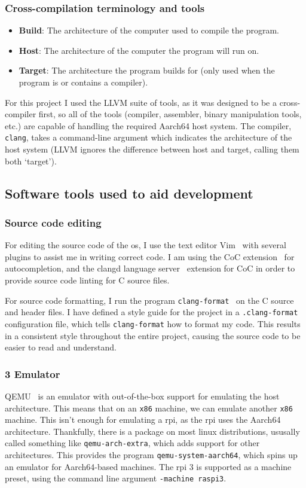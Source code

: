 \documentclass{article}
\begin{document}
\subsubsection{Cross-compilation terminology and tools}
\begin{itemize}
    \item \textbf{Build}: The architecture of the computer used to compile the
        program.
    \item \textbf{Host}: The architecture of the computer the program will run
        on.
    \item \textbf{Target}: The architecture the program builds for (only used
        when the program is or contains a compiler).
\end{itemize}
For this project I used the LLVM suite of tools, as it was designed to be a
cross-compiler first, so all of the tools (compiler, assembler, binary
manipulation tools, etc.) are capable of handling the required Aarch64 host
system. The compiler, \texttt{clang}, takes a command-line argument which indicates
the architecture of the host system (LLVM ignores the difference between host
and target, calling them both `target').
\subsection{Software tools used to aid development}
\subsubsection{Source code editing}
For editing the source code of the \gls{os}, I use the text editor
Vim~\cite{vim} with several plugins to assist me in writing correct code. I am
using the CoC extension~\cite{vim-coc} for autocompletion, and the clangd
language server~\cite{clangd} extension for CoC in order to provide source code
linting for C source files.

For source code formatting, I run the program
\texttt{clang-format}~\cite{clang-format} on the C source and header files. I
have defined a style guide for the project in a \texttt{.clang-format}
configuration file, which tells \texttt{clang-format} how to format my code.
This results in a consistent style throughout the entire project, causing the
source code to be easier to read and understand.

\subsubsection{\texorpdfstring{}{RPi} 3 Emulator}
QEMU~\cite{qemu} is an emulator with out-of-the-box support for emulating the
host architecture. This means that on an \texttt{x86} machine, we can
emulate another \texttt{x86} machine. This isn't enough for emulating a
\gls{rpi}, as the \gls{rpi} uses the Aarch64 architecture. Thankfully, there is
a package on most linux distributions, ususally called something like
\texttt{qemu-arch-extra}, which adds support for other architectures. This
provides the program \texttt{qemu-system-aarch64}, which spins up an emulator
for Aarch64-based machines. The \gls{rpi} 3 is supported as a machine preset,
using the command line argument \texttt{-machine raspi3}.
\end{document}
